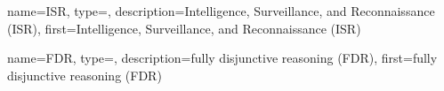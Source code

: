 {
  name=ISR,
  type=\acronymtype,
  description={Intelligence, Surveillance, and Reconnaissance (ISR)},
  first={Intelligence, Surveillance, and Reconnaissance (ISR)}
}

{
  name=FDR,
  type=\acronymtype,
  description={fully disjunctive reasoning (FDR)},
  first={fully disjunctive reasoning (FDR)}
} 